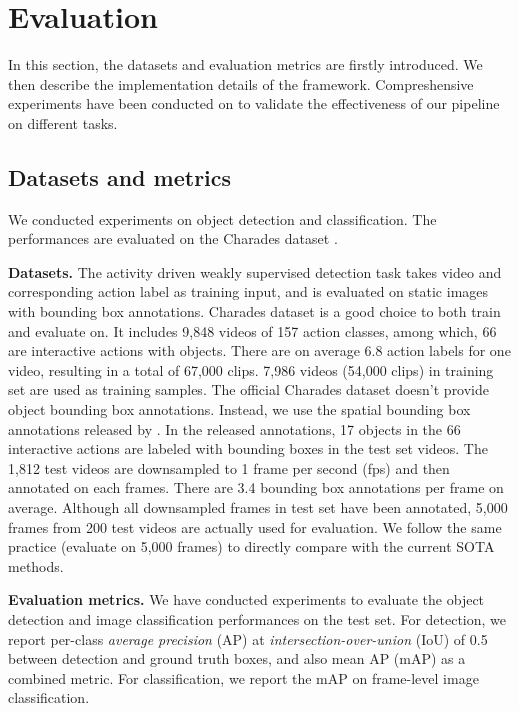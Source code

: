 \section{Evaluation}
\label{sec:evaluation}
In this section, the datasets and evaluation metrics are firstly introduced. We then describe the implementation details of the framework. Compreshensive experiments have been conducted on to validate the effectiveness of our pipeline on different tasks.

\subsection{Datasets and metrics}
We conducted experiments on object detection and classification. The performances are evaluated on the Charades dataset \cite{sigurdsson2016hollywood}.

\textbf{Datasets.} The activity driven weakly supervised detection task takes video and corresponding action label as training input, and is evaluated on static images with bounding box annotations. Charades dataset is a good choice to both train and evaluate on. It includes 9,848 videos of 157 action classes, among which, 66 are interactive actions with objects. There are on average 6.8 action labels for one video, resulting in a total of 67,000 clips. 7,986 videos (54,000 clips) in training set are used as training samples. The official Charades dataset doesn't provide object bounding box annotations. Instead, we use the spatial bounding box annotations released by \cite{yuan2017temporal}. In the released annotations, 17 objects in the 66 interactive actions are labeled with bounding boxes in the test set videos. The 1,812 test videos are downsampled to 1 frame per second (fps) and then annotated on each frames. There are 3.4 bounding box annotations per frame on average. Although all downsampled frames in test set have been annotated, 5,000 frames from 200 test videos are actually used for evaluation. We follow the same practice (evaluate on 5,000 frames) to directly compare with the current SOTA methods.

\textbf{Evaluation metrics.} We have conducted experiments to evaluate the object detection and image classification performances on the test set. For detection, we report per-class \textit{average precision} (AP) at \textit{intersection-over-union} (IoU) of 0.5 between detection and ground truth boxes, and also mean AP (mAP) as a combined metric. For classification, we report the mAP on frame-level image classification. 


